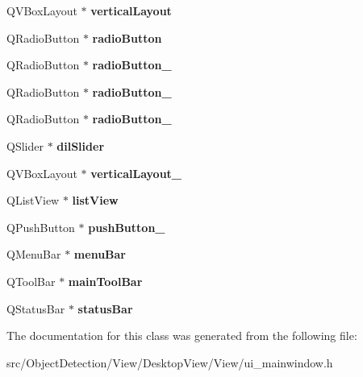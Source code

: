 \begin{DoxyCompactItemize}
\mbox{\label{class_ui___main_window_aecd96a04789fcfec3f98d80390ad8184}} 
Q\+V\+Box\+Layout $\ast$ {\bfseries vertical\+Layout}
\item 
\mbox{\label{class_ui___main_window_a61269a10bc342763a5a51a93a235944d}} 
Q\+Radio\+Button $\ast$ {\bfseries radio\+Button}
\item 
\mbox{\label{class_ui___main_window_aae7b8581981931a792a768767fbf755f}} 
Q\+Radio\+Button $\ast$ {\bfseries radio\+Button\+\_}
\item 
\mbox{\label{class_ui___main_window_a279bf4f986f7426fcede6af133190055}} 
Q\+Radio\+Button $\ast$ {\bfseries radio\+Button\+\_}
\item 
\mbox{\label{class_ui___main_window_ac410fb505e22ae3bf3aefed954d9b961}} 
Q\+Radio\+Button $\ast$ {\bfseries radio\+Button\+\_}
\item 
\mbox{\label{class_ui___main_window_a4e4c33d607d38a4e5bba06ae373b72a3}} 
Q\+Slider $\ast$ {\bfseries dil\+Slider}
\item 
\mbox{\label{class_ui___main_window_a38b8a4b887f3b58e2a49e7905ae6f1f0}} 
Q\+V\+Box\+Layout $\ast$ {\bfseries vertical\+Layout\+\_}
\item 
\mbox{\label{class_ui___main_window_aaf97aba343edd00a0114b406c2b77365}} 
Q\+List\+View $\ast$ {\bfseries list\+View}
\item 
\mbox{\label{class_ui___main_window_acb0b2f196dc2224f287b67594233297f}} 
Q\+Push\+Button $\ast$ {\bfseries push\+Button\+\_}
\item 
\mbox{\label{class_ui___main_window_a2be1c24ec9adfca18e1dcc951931457f}} 
Q\+Menu\+Bar $\ast$ {\bfseries menu\+Bar}
\item 
\mbox{\label{class_ui___main_window_a5172877001c8c7b4e0f6de50421867d1}} 
Q\+Tool\+Bar $\ast$ {\bfseries main\+Tool\+Bar}
\item 
\mbox{\label{class_ui___main_window_a50fa481337604bcc8bf68de18ab16ecd}} 
Q\+Status\+Bar $\ast$ {\bfseries status\+Bar}
\end{DoxyCompactItemize}


The documentation for this class was generated from the following file\+:\begin{DoxyCompactItemize}
\item 
src/\+Object\+Detection/\+View/\+Desktop\+View/\+View/ui\+\_\+mainwindow.\+h\end{DoxyCompactItemize}

